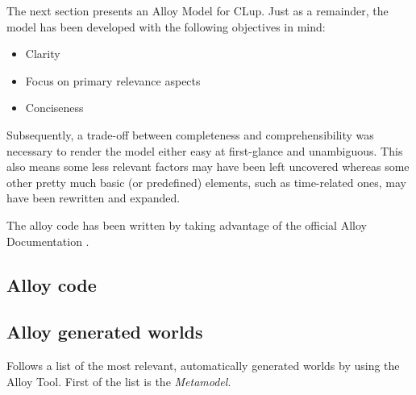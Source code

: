 The next section presents an Alloy Model for CLup. Just as a remainder, the model has been developed with the following objectives in mind: \newline

\begin{itemize}
    \item Clarity
    \item Focus on primary relevance aspects
    \item Conciseness
\end{itemize}

Subsequently, a trade-off between completeness and comprehensibility was necessary to render the model either easy at first-glance and unambiguous. \newline 
This also means some less relevant factors may have been left uncovered whereas some other pretty much basic (or predefined) elements, such as time-related ones, may have been rewritten and expanded. \newline 

\noindent The alloy code has been written by taking advantage of the official Alloy Documentation \cite{Alloy:Docs}.\newline


{\color{gray}
}



\subsection{Alloy code \label{alloy_code}}




\subsection{Alloy generated worlds}
Follows a list of the most relevant, automatically generated worlds by using the Alloy Tool. First of the list is the \textit{Metamodel}.

